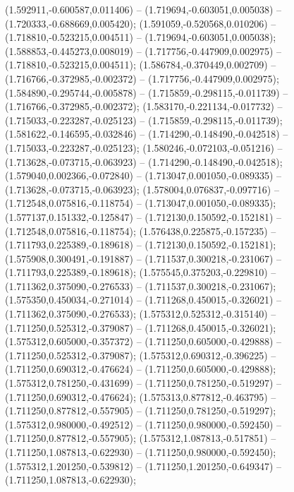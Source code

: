  (1.592911,-0.600587,0.011406) -- (1.719694,-0.603051,0.005038) -- (1.720333,-0.688669,0.005420);
 (1.591059,-0.520568,0.010206) -- (1.718810,-0.523215,0.004511) -- (1.719694,-0.603051,0.005038);
 (1.588853,-0.445273,0.008019) -- (1.717756,-0.447909,0.002975) -- (1.718810,-0.523215,0.004511);
 (1.586784,-0.370449,0.002709) -- (1.716766,-0.372985,-0.002372) -- (1.717756,-0.447909,0.002975);
 (1.584890,-0.295744,-0.005878) -- (1.715859,-0.298115,-0.011739) -- (1.716766,-0.372985,-0.002372);
 (1.583170,-0.221134,-0.017732) -- (1.715033,-0.223287,-0.025123) -- (1.715859,-0.298115,-0.011739);
 (1.581622,-0.146595,-0.032846) -- (1.714290,-0.148490,-0.042518) -- (1.715033,-0.223287,-0.025123);
 (1.580246,-0.072103,-0.051216) -- (1.713628,-0.073715,-0.063923) -- (1.714290,-0.148490,-0.042518);
 (1.579040,0.002366,-0.072840) -- (1.713047,0.001050,-0.089335) -- (1.713628,-0.073715,-0.063923);
 (1.578004,0.076837,-0.097716) -- (1.712548,0.075816,-0.118754) -- (1.713047,0.001050,-0.089335);
 (1.577137,0.151332,-0.125847) -- (1.712130,0.150592,-0.152181) -- (1.712548,0.075816,-0.118754);
 (1.576438,0.225875,-0.157235) -- (1.711793,0.225389,-0.189618) -- (1.712130,0.150592,-0.152181);
 (1.575908,0.300491,-0.191887) -- (1.711537,0.300218,-0.231067) -- (1.711793,0.225389,-0.189618);
 (1.575545,0.375203,-0.229810) -- (1.711362,0.375090,-0.276533) -- (1.711537,0.300218,-0.231067);
 (1.575350,0.450034,-0.271014) -- (1.711268,0.450015,-0.326021) -- (1.711362,0.375090,-0.276533);
 (1.575312,0.525312,-0.315140) -- (1.711250,0.525312,-0.379087) -- (1.711268,0.450015,-0.326021);
 (1.575312,0.605000,-0.357372) -- (1.711250,0.605000,-0.429888) -- (1.711250,0.525312,-0.379087);
 (1.575312,0.690312,-0.396225) -- (1.711250,0.690312,-0.476624) -- (1.711250,0.605000,-0.429888);
 (1.575312,0.781250,-0.431699) -- (1.711250,0.781250,-0.519297) -- (1.711250,0.690312,-0.476624);
 (1.575313,0.877812,-0.463795) -- (1.711250,0.877812,-0.557905) -- (1.711250,0.781250,-0.519297);
 (1.575312,0.980000,-0.492512) -- (1.711250,0.980000,-0.592450) -- (1.711250,0.877812,-0.557905);
 (1.575312,1.087813,-0.517851) -- (1.711250,1.087813,-0.622930) -- (1.711250,0.980000,-0.592450);
 (1.575312,1.201250,-0.539812) -- (1.711250,1.201250,-0.649347) -- (1.711250,1.087813,-0.622930);
